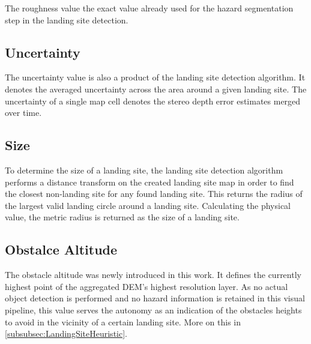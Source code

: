 The roughness value the exact value already used for the hazard segmentation step in the landing site detection. 

\subsection{Uncertainty}

The uncertainty value is also a product of the landing site detection algorithm. It denotes the averaged uncertainty across the area around a given landing site. The uncertainty of a single map cell denotes the stereo depth error estimates merged over time.

\subsection{Size}

To determine the size of a landing site, the landing site detection algorithm performs a distance transform on the created landing site map in order to find the closest non-landing site for any found landing site. This returns the radius of the largest valid landing circle around a landing site. Calculating the physical value, the metric radius is returned as the size of a landing site.

\subsection{Obstalce Altitude}\label{subsec:obstacle_altitude}

The obstacle altitude was newly introduced in this work. It defines the currently highest point of the aggregated DEM's highest resolution layer. As no actual object detection is performed and no hazard information is retained in this visual pipeline, this value serves the autonomy as an indication of the obstacles heights to avoid in the vicinity of a certain landing site. More on this in \cref{subsubsec:LandingSiteHeuristic}.



